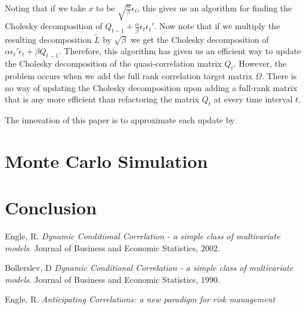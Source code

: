 \documentclass{article} %
\numberwithin{equation}{section} %
\numberwithin{figure}{section} %
\numberwithin{table}{section} %
\begin{document}
Noting that if we take $x$ to be $\sqrt{\frac{\alpha}{\beta}}\epsilon_t$, this gives us an algorithm for finding the Cholesky decomposition of $Q_{t-1} + \frac{\alpha }{\beta}\epsilon_t \epsilon_t'$. Now note that if we multiply the resulting decomposition $\tilde{L}$ by $\sqrt{\beta}$ we get the Cholesky decomposition of $\alpha \epsilon_t' \epsilon_t + \beta Q_{t-1}$. Therefore, this algorithm has given us an efficient way to update the Cholesky decomposition of the quasi-correlation matrix $Q_t$. However, the problem occurs when we add the full rank correlation target matrix $\Omega$. There is no way of updating the Cholesky decomposition upon adding a full-rank matrix that is any more efficient than refactoring the matrix $Q_t$ at every time interval $t$.

The innovation of this paper is to approximate each update by


\section{Monte Carlo Simulation}


\section{Conclusion}

\begin{thebibliography}{9}
Engle, R.
\textit{Dynamic Conditional Correlation - a simple class of multivariate models}.
Journal of Business and Economic Statistics, 2002.

Bollerslev, D
\textit{Dynamic Conditional Correlation - a simple class of multivariate models}.
Journal of Business and Economic Statistics, 1990.

Engle, R.
\textit{Anticipating Correlations: a new paradigm for risk management}
\end{thebibliography}
\end{document}
